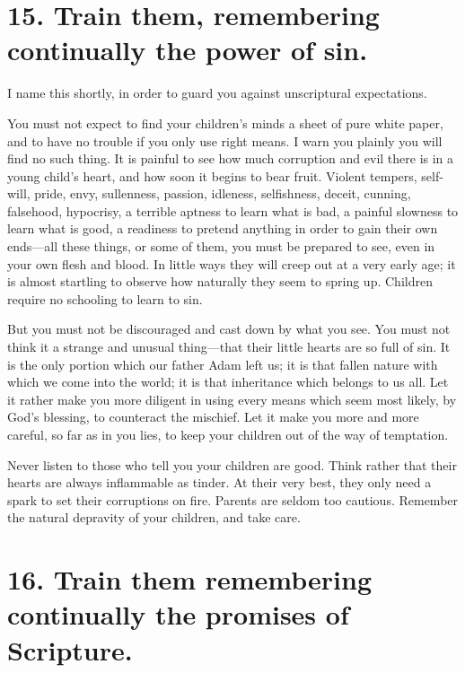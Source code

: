 \documentclass[
]{book}
\begin{document}
\hypertarget{train-them-remembering-continually-the-power-of-sin.}{%
\section*{15. Train them, remembering continually the power of sin.}\label{train-them-remembering-continually-the-power-of-sin.}}

I name this shortly, in order to guard you against unscriptural expectations.

You must not expect to find your children's minds a sheet of pure white paper, and to have no trouble if you only use right means. I warn you plainly you will find no such thing. It is painful to see how much corruption and evil there is in a young child's heart, and how soon it begins to bear fruit. Violent tempers, self-will, pride, envy, sullenness, passion, idleness, selfishness, deceit, cunning, falsehood, hypocrisy, a terrible aptness to learn what is bad, a painful slowness to learn what is good, a readiness to pretend anything in order to gain their own ends---all these things, or some of them, you must be prepared to see, even in your own flesh and blood. In little ways they will creep out at a very early age; it is almost startling to observe how naturally they seem to spring up. Children require no schooling to learn to sin.

But you must not be discouraged and cast down by what you see. You must not think it a strange and unusual thing---that their little hearts are so full of sin. It is the only portion which our father Adam left us; it is that fallen nature with which we come into the world; it is that inheritance which belongs to us all. Let it rather make you more diligent in using every means which seem most likely, by God's blessing, to counteract the mischief. Let it make you more and more careful, so far as in you lies, to keep your children out of the way of temptation.

Never listen to those who tell you your children are good. Think rather that their hearts are always inflammable as tinder. At their very best, they only need a spark to set their corruptions on fire. Parents are seldom too cautious. Remember the natural depravity of your children, and take care.

\hypertarget{train-them-remembering-continually-the-promises-of-scripture.}{%
\section*{16. Train them remembering continually the promises of Scripture.}\label{train-them-remembering-continually-the-promises-of-scripture.}}
\end{document}
